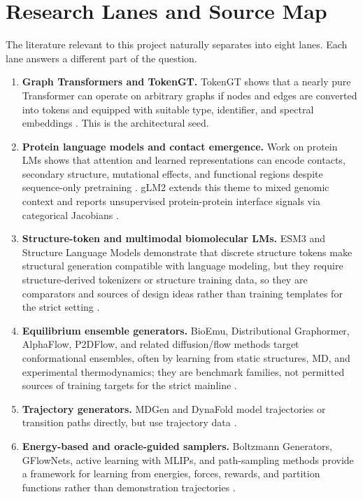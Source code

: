 \documentclass[11pt]{article}
\begin{document}
\section{Research Lanes and Source Map}

The literature relevant to this project naturally separates into eight lanes. Each lane answers a different part of the question.

\begin{enumerate}[leftmargin=2em]
  \item \textbf{Graph Transformers and TokenGT.} TokenGT shows that a nearly pure Transformer can operate on arbitrary graphs if nodes and edges are converted into tokens and equipped with suitable type, identifier, and spectral embeddings \cite{kim2022tokengt}. This is the architectural seed.
  \item \textbf{Protein language models and contact emergence.} Work on protein LMs shows that attention and learned representations can encode contacts, secondary structure, mutational effects, and functional regions despite sequence-only pretraining \cite{rives2021biological,rao2021unsupervised,vig2021bertology,rao2021msa}. gLM2 extends this theme to mixed genomic context and reports unsupervised protein-protein interface signals via categorical Jacobians \cite{cornman2024omg}.
  \item \textbf{Structure-token and multimodal biomolecular LMs.} ESM3 and Structure Language Models demonstrate that discrete structure tokens make structural generation compatible with language modeling, but they require structure-derived tokenizers or structure training data, so they are comparators and sources of design ideas rather than training templates for the strict setting \cite{hayes2024esm3,lu2025slm}.
  \item \textbf{Equilibrium ensemble generators.} BioEmu, Distributional Graphormer, AlphaFlow, P2DFlow, and related diffusion/flow methods target conformational ensembles, often by learning from static structures, MD, and experimental thermodynamics; they are benchmark families, not permitted sources of training targets for the strict mainline \cite{lewis2025bioemu,zheng2024dig,jing2024alphaflow,jin2025p2dflow}.
  \item \textbf{Trajectory generators.} MDGen and DynaFold model trajectories or transition paths directly, but use trajectory data \cite{jing2024mdgen,fan2025dynafold}.
  \item \textbf{Energy-based and oracle-guided samplers.} Boltzmann Generators, GFlowNets, active learning with MLIPs, and path-sampling methods provide a framework for learning from energies, forces, rewards, and partition functions rather than demonstration trajectories \cite{noe2019boltzmann,bengio2021gflownet,bengio2023gflownet,malkin2022trajectory}.

\end{enumerate}
\end{document}

